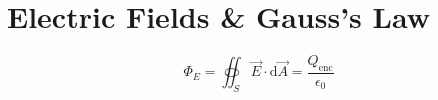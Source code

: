 \chapter{Electric Fields \& Gauss's Law}

\[\Phi_E = \oiint_S \vec{E}\cdot\mathrm{d}\vec{A} = \frac{Q_{\mathrm{enc}}}{\epsilon_0}\]

